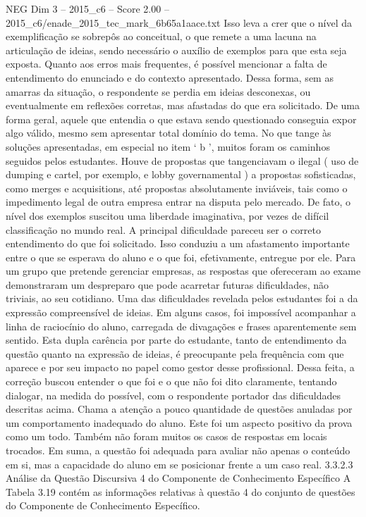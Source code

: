 \begin{textsample}{NEG Dim 3 – 2015\_c6 – Score 2.00 – 2015\_c6/enade\_2015\_tec\_mark\_6b65a1aace.txt}
Isso leva a crer que o nível da exemplificação se sobrepôs ao conceitual, o que remete a uma lacuna na articulação de ideias, sendo necessário o auxílio de exemplos para que esta seja exposta.
Quanto aos erros mais frequentes, é possível mencionar a falta de entendimento do enunciado e do contexto apresentado.
Dessa forma, sem as amarras da situação, o respondente se perdia em ideias desconexas, ou eventualmente em reflexões corretas, mas afastadas do que era solicitado.
De uma forma geral, aquele que entendia o que estava sendo questionado conseguia expor algo válido, mesmo sem apresentar total domínio do tema.
No que tange às soluções apresentadas, em especial no item ‘ b ’, muitos foram os caminhos seguidos pelos estudantes.
Houve de propostas que tangenciavam o ilegal ( uso de dumping e cartel, por exemplo, e lobby governamental ) a propostas sofisticadas, como merges e acquisitions, até propostas absolutamente inviáveis, tais como o impedimento legal de outra empresa entrar na disputa pelo mercado.
De fato, o nível dos exemplos suscitou uma liberdade imaginativa, por vezes de difícil classificação no mundo real.
A principal dificuldade pareceu ser o correto entendimento do que foi solicitado.
Isso conduziu a um afastamento importante entre o que se esperava do aluno e o que foi, efetivamente, entregue por ele.
Para um grupo que pretende gerenciar empresas, as respostas que ofereceram ao exame demonstraram um despreparo que pode acarretar futuras dificuldades, não triviais, ao seu cotidiano.
Uma das dificuldades revelada pelos estudantes foi a da expressão compreensível de ideias.
Em alguns casos, foi impossível acompanhar a linha de raciocínio do aluno, carregada de divagações e frases aparentemente sem sentido.
Esta dupla carência por parte do estudante, tanto de entendimento da questão quanto na expressão de ideias, é preocupante pela frequência com que aparece e por seu impacto no papel como gestor desse profissional.
Dessa feita, a correção buscou entender o que foi e o que não foi dito claramente, tentando dialogar, na medida do possível, com o respondente portador das dificuldades descritas acima.
Chama a atenção a pouco quantidade de questões anuladas por um comportamento inadequado do aluno.
Este foi um aspecto positivo da prova como um todo.
Também não foram muitos os casos de respostas em locais trocados.
Em suma, a questão foi adequada para avaliar não apenas o conteúdo em si, mas a capacidade do aluno em se posicionar frente a um caso real. 3.3.2.3 Análise da Questão Discursiva 4 do Componente de Conhecimento Específico A Tabela 3.19 contém as informações relativas à questão 4 do conjunto de questões do Componente de Conhecimento Específico.

\end{textsample}
